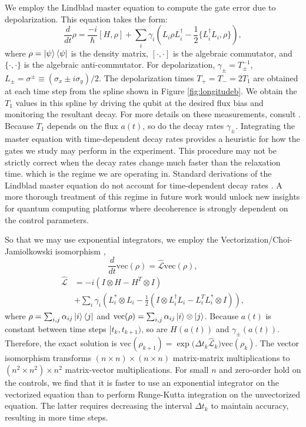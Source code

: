 We employ the Lindblad master equation
to compute the gate error due to depolarization.
This equation takes the form:
\begin{equation}
  \frac{d}{dt} \rho = \frac{-i}{\hbar} [H, \rho]
  + \sum_{i} \gamma_{i} (L_{i} \rho L_{i}^{\dagger}
  - \frac{1}{2} \{L_{i}^{\dagger} L_{i}, \rho\}),
\end{equation}
where $\rho = \ket{\psi}\bra{\psi}$ is the density matrix,
$[\cdot, \cdot]$ is the algebraic commutator, and $\{\cdot, \cdot \}$ is the algebraic
anti-commutator.
For depolarization, $\gamma_{\pm} = T_{\pm}^{-1}$,
$L_{\pm} = \sigma^{\pm} \equiv (\sigma_{x} \pm i \sigma_{y})/2$.
The depolarization times $T_{+} = T_{-} = 2 T_{1}$ are obtained at each time step
from the spline shown in Figure \ref{fig:longitudeb}.
We obtain the $T_{1}$ values in this spline
by driving the qubit at the desired flux bias
and monitoring the resultant decay. For more details
on these measurements, consult \cite{zhang2020universal}.
Because $T_{1}$ depends on the flux $a(t)$, so do
the decay rates $\gamma_{\pm}$.
Integrating the master equation with time-dependent decay rates
provides a heuristic for how the gates we study may perform in
the experiment. 
This procedure may not be strictly correct
when the decay rates change much faster
than the relaxation time.
which is the regime we are operating in. Standard
derivations of the Lindblad master equation do not account for
time-dependent decay rates \cite{manzano2020a}. A more thorough
treatment of this regime in future work would unlock new insights for
quantum computing platforms where decoherence is strongly
dependent on the control parameters.

So that we may use exponential integrators, we employ
the Vectorization/Choi-Jamiolkowski isomorphism \cite{Landi2018},
\begin{equation}
  \frac{d}{dt} \textrm{vec}({\rho}) = \hat{\mathcal{L}} \textrm{vec}({\rho}),
\end{equation}
\begin{equation}
  \begin{aligned}
    \hat{\mathcal{L}} &= -i(I \otimes H - H^{T} \otimes I)\\
    &+ \sum_{i} \gamma_{i}
    (L_{i}^{*} \otimes L_{i} - \frac{1}{2} (I \otimes L_{i}^{\dagger}L_{i}
    - L_{i}^{T}L_{i}^{*} \otimes I)),
  \end{aligned}
\end{equation}
where $\rho = \sum_{i, j} \alpha_{ij} \ket{i}\bra{j}$
and $\textrm{vec}(\rho) = \sum_{i, j} \alpha_{ij} \ket{i} \otimes \ket{j}$.
Because $a(t)$ is constant between time steps $[t_{k}, t_{k + 1})$,
so are $H(a(t))$ and $\gamma_{\pm}(a(t))$.
Therefore, the exact solution is
$\textrm{vec}(\rho_{k + 1}) = {\exp}{\textstyle(}\Delta t_{k}
\hat{\mathcal{L}}_{k}{\textstyle)} \textrm{vec}(\rho_{k})$.
The vector isomorphism transforms $(n \times n) \times (n \times n)$
matrix-matrix multiplications to $(n^{2} \times n^{2}) \times n^{2}$ matrix-vector
multiplications. For small $n$ and zero-order hold on the controls, we find that it is
faster to use an exponential integrator on the vectorized equation than to perform
Runge-Kutta integration on the unvectorized equation. The latter requires decreasing the interval $\Delta t_{k}$
to maintain accuracy, resulting in more time steps.
